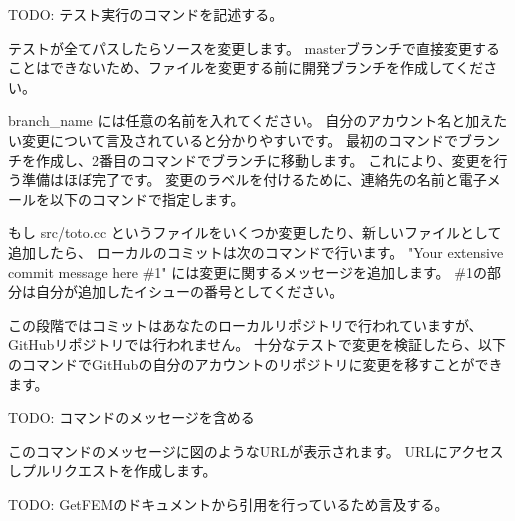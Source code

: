 \documentclass{ltjoc}
\begin{document}
TODO: テスト実行のコマンドを記述する。

テストが全てパスしたらソースを変更します。
masterブランチで直接変更することはできないため、ファイルを変更する前に開発ブランチを作成してください。

\begin{shbox}
\end{shbox}

\begin{shbox}
\end{shbox}

branch\_name には任意の名前を入れてください。
自分のアカウント名と加えたい変更について言及されていると分かりやすいです。
最初のコマンドでブランチを作成し、2番目のコマンドでブランチに移動します。
これにより、変更を行う準備はほぼ完了です。
変更のラベルを付けるために、連絡先の名前と電子メールを以下のコマンドで指定します。

\begin{shbox}
\end{shbox}

もし src/toto.cc というファイルをいくつか変更したり、新しいファイルとして追加したら、
ローカルのコミットは次のコマンドで行います。
"Your extensive commit message here \#1" には変更に関するメッセージを追加します。
\#1の部分は自分が追加したイシューの番号としてください。

\begin{shbox}
\end{shbox}

この段階ではコミットはあなたのローカルリポジトリで行われていますが、GitHubリポジトリでは行われません。
十分なテストで変更を検証したら、以下のコマンドでGitHubの自分のアカウントのリポジトリに変更を移すことができます。

\begin{shbox}
\end{shbox}

TODO: コマンドのメッセージを含める

このコマンドのメッセージに図のようなURLが表示されます。
URLにアクセスしプルリクエストを作成します。

TODO: GetFEMのドキュメントから引用を行っているため言及する。
\end{document}
